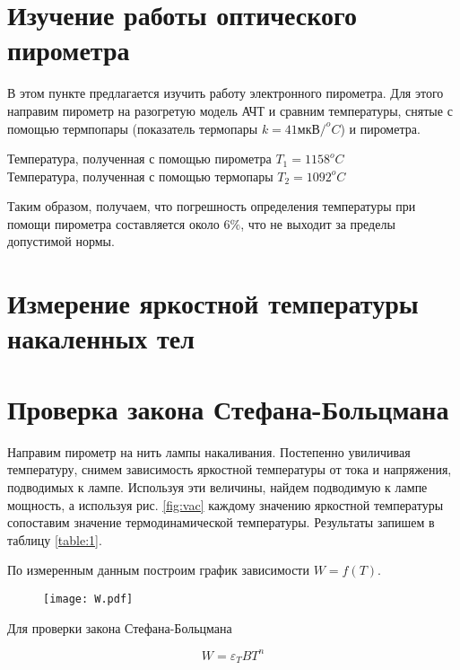 	\section*{Изучение работы оптического пирометра}

	В этом пункте предлагается изучить работу электронного пирометра. Для этого направим пирометр на
	разогретую модель АЧТ и сравним температуры, снятые с помощью термпопары (показатель термопары $k = 41 \text{мкВ/}^oC$) и пирометра.

	\begin{center}
		Температура, полученная с помощью пирометра $T_1 = 1158 ^oC$ \\
		Температура, полученная с помощью термопары $T_2 = 1092 ^oC$ \\
	\end{center}

	Таким образом, получаем, что погрешность определения температуры при помощи пирометра составляется около $6 \%$,
	что не выходит за пределы допустимой нормы.

	\section*{Измерение яркостной температуры накаленных тел}

	\section*{Проверка закона Стефана-Больцмана}

	Направим пирометр на нить лампы накаливания. Постепенно увиличивая температуру, снимем зависимость 
	яркостной температуры от тока и напряжения, подводимых к лампе. Используя эти величины, найдем
	подводимую к лампе мощность, а используя рис. \ref{fig:vac} каждому значению яркостной температуры
	сопоставим значение термодинамической температуры. Результаты запишем в таблицу \ref{table:1}.

	

	По измеренным данным построим график зависимости $W = f(T)$.

	\begin{figure}[h]
		\centering
		\texttt{[image: W.pdf]}
		\label{fig:W}
	\end{figure}

	Для проверки закона Стефана-Больцмана

	\begin{equation*}
		W = \varepsilon_T B T^n
	\end{equation*}


